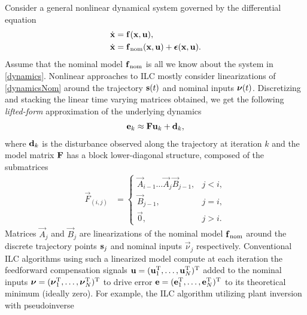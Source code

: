 Consider a general nonlinear dynamical system governed by the differential equation
%
\begin{align}
\dot{\boldsymbol{\mathrm{x}}} &= \boldsymbol{\mathrm{f}}(\boldsymbol{\mathrm{x}},\boldsymbol{\mathrm{u}}), \label{dynamics} \\
\dot{\boldsymbol{\mathrm{x}}} &= \boldsymbol{\mathrm{f}}_{\mathrm{nom}}(\boldsymbol{\mathrm{x}},\boldsymbol{\mathrm{u}}) + \boldsymbol{\mathrm{\epsilon}}(\boldsymbol{\mathrm{x}},\boldsymbol{\mathrm{u}}). \label{dynamicsNom}
\end{align}
%
\noindent Assume that the nominal model $\boldsymbol{\mathrm{f}}_{\mathrm{nom}}$ is all we know about the system in \eqref{dynamics}. Nonlinear approaches to ILC mostly consider linearizations of \eqref{dynamicsNom} around the trajectory $\boldsymbol{\mathrm{s}}(t)$ and nominal inputs $\boldsymbol{\mathrm{\nu}}(t)$.
Discretizing and stacking the linear time varying matrices obtained, we get the following \emph{lifted-form} approximation of the underlying dynamics
%
\begin{equation}
\begin{aligned}
\boldsymbol{\mathrm{e}}_k \approx \boldsymbol{\mathrm{F}} \boldsymbol{\mathrm{u}}_k + \boldsymbol{\mathrm{d}}_k,
\end{aligned}
\label{approxModel}
\end{equation}
%
\noindent where $\boldsymbol{\mathrm{d}}_k$ is the disturbance observed along the trajectory at iteration $k$ and the model matrix $\boldsymbol{\mathrm{F}}$ has a block lower-diagonal structure, composed of the submatrices
%
\begin{equation}
\begin{aligned}
\vec{F}_{(i,j)} &= \left \{
\begin{array}{cc}
\vec{A}_{i-1}\ldots \vec{A}_j \vec{B}_{j-1}, & j < i, \\ 
\vec{B}_{j-1}, & j = i, \\
\vec{0}, & j > i. 
\end{array} \right.
\end{aligned}
\label{Fmatrix}
\end{equation}
%
\noindent Matrices $\vec{A}_j$ and $\vec{B}_j$ are linearizations of the nominal model $\boldsymbol{\mathrm{f}}_{\mathrm{nom}}$ around the discrete trajectory points $\boldsymbol{\mathrm{s}}_j$ and nominal inputs $\vec{\nu}_j$ respectively. Conventional ILC algorithms using such a linearized model compute at each iteration the feedforward compensation signals $\boldsymbol{\mathrm{u}} = (\boldsymbol{\mathrm{u}}_1^{\mathrm{T}}, \ldots, \boldsymbol{\mathrm{u}}_N^{\mathrm{T}})^{\mathrm{T}}$ added to the nominal inputs $\boldsymbol{\mathrm{\nu}} = (\boldsymbol{\mathrm{\nu}}_1^{\mathrm{T}}, \ldots, \boldsymbol{\mathrm{\nu}}_N^{\mathrm{T}})^{\mathrm{T}}$ to drive error $\boldsymbol{\mathrm{e}} = (\boldsymbol{\mathrm{e}}_1^{\mathrm{T}}, \ldots, \boldsymbol{\mathrm{e}}_N^{\mathrm{T}})^{\mathrm{T}}$ to its theoretical minimum (ideally zero). For example, the ILC algorithm utilizing plant inversion with pseudoinverse 
